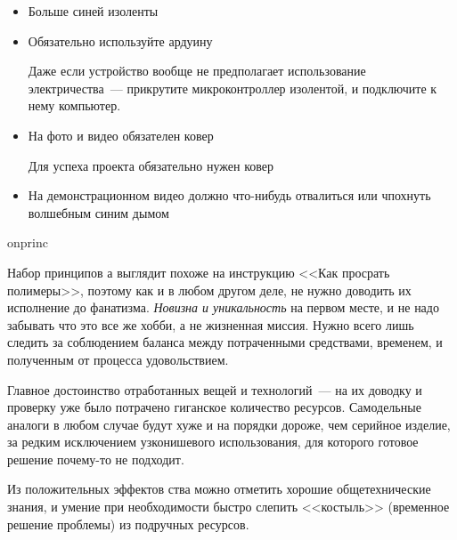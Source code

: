 \begin{editorial}{1}
\begin{itemize}
\item Больше синей изоленты

\item Обязательно используйте ардуину

Даже если устройство вообще не предполагает использование электричества\ ---
прикрутите микроконтроллер изолентой, и подключите к нему компьютер.

\item На фото и видео обязателен ковер  

Для успеха проекта обязательно нужен ковер

\item На демонстрационном видео должно что-нибудь отвалиться или чпохнуть
волшебным синим дымом
   
\end{itemize}	

\end{editorial}

\begin{editorial}{1}
	{}
	{}
	{onprinc}
	
Набор принципов \scr а выглядит похоже на инструкцию <<Как просрать полимеры>>,
поэтому как и в любом другом деле, не нужно доводить их исполнение до фанатизма.
\emph{Новизна и уникальность} на первом месте, и не надо забывать что это все же
хобби, а не жизненная миссия. Нужно всего лишь следить за соблюдением баланса
между потраченными средствами, временем, и полученным от процесса удовольствием.

Главное достоинство отработанных вещей и технологий\ --- на их доводку и
проверку уже было потрачено гиганское количество ресурсов. Самодельные аналоги в
любом случае будут хуже и на порядки дороже, чем серийное изделие, за редким
исключением узконишевого использования, для которого готовое решение почему-то
не подходит.

Из положительных эффектов \scr ства можно отметить хорошие общетехнические
знания, и умение при необходимости быстро слепить <<костыль>> (временное решение
проблемы) из подручных ресурсов.
	
\end{editorial}


